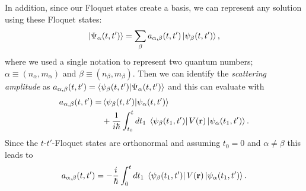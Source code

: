 In addition, since our Floquet states create a basis, we can represent any solution using these Floquet states:
\begin{equation} \label{eq_c12}
  \ket{\Psi_{\alpha}(t,t')} = \sum_{\beta} a_{\alpha,\beta}(t,t')
  \ket{\psi_{\beta}(t,t')},
\end{equation}
where we used a single notation to represent two quantum numbers; $\alpha \equiv (n_{\alpha},m_{\alpha})$ and $\beta \equiv (n_{\beta},m_{\beta})$.
Then we can identify the \textit{scattering amplitude} as $a_{\alpha,\beta}(t,t') =
\braket{\psi_{\beta}(t,t')}{\Psi_{\alpha}(t,t')}$ and this can evaluate with
\begin{equation} \label{eq_c13}
  \begin{aligned}
  a_{\alpha,\beta}(t,t') = &
  \braket{\psi_{\beta}(t,t')}{\psi_{\alpha}(t,t')} \\
  &+
  \frac{1}{i\hbar}
  \int_{t_0}^t dt_1 \;
  \bra{\psi_{\beta}(t_1,t')}
  V(\vb{r}) \ket{\psi_{\alpha}(t_1,t')}.
  \end{aligned}
\end{equation}
Since the $t$-$t'$-Floquet states are orthonormal and assuming $t_0 = 0$ and $\alpha \neq \beta$ this leads to
\begin{equation} \label{eq_c14}
  a_{\alpha,\beta}(t,t') =
  -
  \frac{i}{\hbar}
  \int_{0}^t dt_1 \;
  \bra{\psi_{\beta}(t_1,t')}
  V(\vb{r}) \ket{\psi_{\alpha}(t_1,t')}.
\end{equation}

